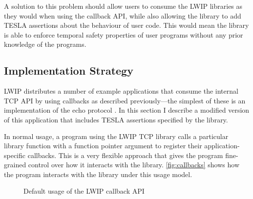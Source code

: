 A solution to this problem should allow users to consume the LWIP libraries as
they would when using the callback API, while also allowing the library to add
TESLA assertions about the behaviour of user code. This would mean the library
is able to enforce temporal safety properties of user programs without any prior
knowledge of the programs.

\subsection{Implementation Strategy}

LWIP distributes a number of example applications that consume the internal TCP
API by using callbacks as described previously---the simplest of these is an
implementation of the echo protocol \cite{RFC0862}. In this section I describe a
modified version of this application that includes TESLA assertions specified by
the library.

In normal usage, a program using the LWIP TCP library calls a particular library
function with a function pointer argument to register their application-specific
callbacks. This is a very flexible approach that gives the program fine-grained
control over how it interacts with the library. \autoref{fig:callbacks} shows
how the program interacts with the library under this usage model.

\begin{figure}[ht]
  \centering
  \caption{Default usage of the LWIP callback API}
  \label{fig:callbacks}
\end{figure}


